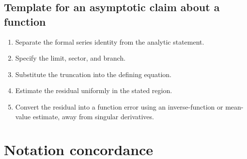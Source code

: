 \documentclass[11pt,openany]{book}
\theoremstyle{definition}
\theoremstyle{plain}
\theoremstyle{remark}
\begin{document}
\section{Template for an asymptotic claim about a function}
\begin{enumerate}
\item Separate the formal series identity from the analytic statement.
\item Specify the limit, sector, and branch.
\item Substitute the truncation into the defining equation.
\item Estimate the residual uniformly in the stated region.
\item Convert the residual into a function error using an inverse-function or mean-value estimate, away from singular derivatives.
\end{enumerate}

\chapter{Notation concordance}\label{app:notation}
\end{document}

